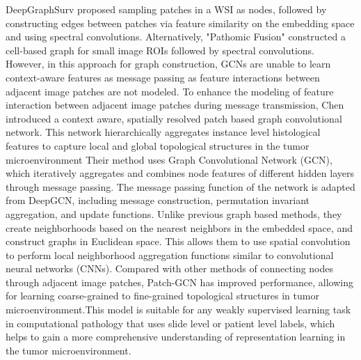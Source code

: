 \documentclass[journal,twoside,web]{ieeecolor}
\begin{document}
DeepGraphSurv proposed sampling patches in a WSI as nodes, followed by constructing edges between patches via feature similarity on the embedding space and using spectral convolutions. Alternatively, "Pathomic Fusion" constructed a cell-based graph for small image ROIs followed by spectral convolutions. However, in this approach for graph construction, GCNs are unable to learn context-aware features as message passing as feature interactions between adjacent image patches are not modeled.
To enhance the modeling of feature interaction between adjacent image patches during message transmission, Chen \cite{chen2021whole} introduced a context aware, spatially resolved patch based graph convolutional network. This network hierarchically aggregates instance level histological features to capture local and global topological structures in the tumor microenvironment
Their method uses Graph Convolutional Network (GCN), which iteratively aggregates and combines node features of different hidden layers through message passing. The message passing function of the network is adapted from DeepGCN\cite{li2019deepgcns}, including message construction, permutation invariant aggregation, and update functions. Unlike previous graph based methods, they create neighborhoods based on the nearest neighbors in the embedded space, and construct graphs in Euclidean space. This allows them to use spatial convolution to perform local neighborhood aggregation functions similar to convolutional neural networks (CNNs). Compared with other methods of connecting nodes through adjacent image patches, Patch-GCN has improved performance, allowing for learning coarse-grained to fine-grained topological structures in tumor microenvironment.This model is suitable for any weakly supervised learning task in computational pathology that uses slide level or patient level labels, which helps to gain a more comprehensive understanding of representation learning in the tumor microenvironment.
\end{document}
